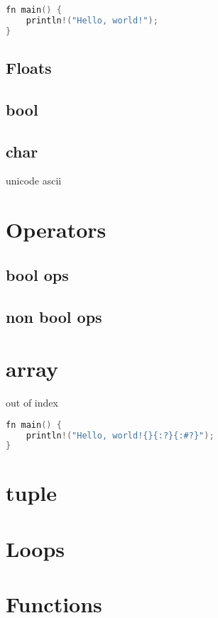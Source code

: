 \documentclass{book}
\begin{document}
\begin{lstlisting}[language=C, caption=Definition variables]
fn main() {
    println!("Hello, world!");
}
\end{lstlisting}
\subsection{Floats}
\subsection{bool}
\subsection{char}
unicode
ascii
\section{Operators}
\subsection{bool ops}
\subsection{non bool ops}
\section{array}
out of index
\begin{lstlisting}[language=C, caption=Definition variables]
fn main() {
    println!("Hello, world!{}{:?}{:#?}");
}
\end{lstlisting}
\section{tuple}

\section{Loops}

\section{Functions}
\lstlistoflistings
\end{document}
